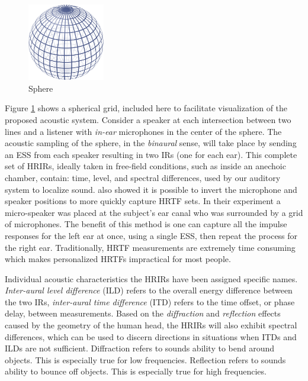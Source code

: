 \begin{figure}[ht!]%
\centering
\includegraphics[width=0.3\textwidth]{img/sphere-png.png} 
\caption{Sphere \cite{Spherewi43:online}}
\label{fig:sphere}
\end{figure}

Figure \ref{fig:sphere} shows a spherical grid, included here to facilitate visualization of the proposed acoustic system. Consider a speaker at each intersection between two lines and a listener with \textit{in-ear} microphones in the center of the sphere. The acoustic sampling of the sphere, in the \textit{binaural} sense, will take place by sending an ESS from each speaker resulting in two IRs (one for each ear). This complete set of HRIRs, ideally taken in free-field conditions, such as inside an anechoic chamber, contain: time, level, and spectral differences, used by our auditory system to localize sound. \cite{zotkin2006fast} also showed it is possible to invert the microphone and speaker positions to more quickly capture HRTF sets. In their experiment a micro-speaker was placed at the subject's ear canal who was surrounded by a grid of microphones. The benefit of this method is one can capture all the impulse responses for the left ear at once, using a single ESS, then repeat the process for the right ear. Traditionally, HRTF measurements are extremely time consuming which makes personalized HRTFs impractical for most people.

Individual acoustic characteristics the HRIRs have been assigned specific names. \textit{Inter-aural level difference} (ILD) refers to the overall energy difference between the two IRs, \textit{inter-aural time difference} (ITD) refers to the time offset, or phase delay, between measurements. Based on the \textit{diffraction} and \textit{reflection} effects caused by the geometry of the human head, the HRIRs will also exhibit spectral differences, which can be used to discern directions in situations when ITDs and ILDs are not sufficient. Diffraction refers to sounds ability to bend around objects. This is especially true for low frequencies. Reflection refers to sounds ability to bounce off objects. This is especially true for high frequencies.

